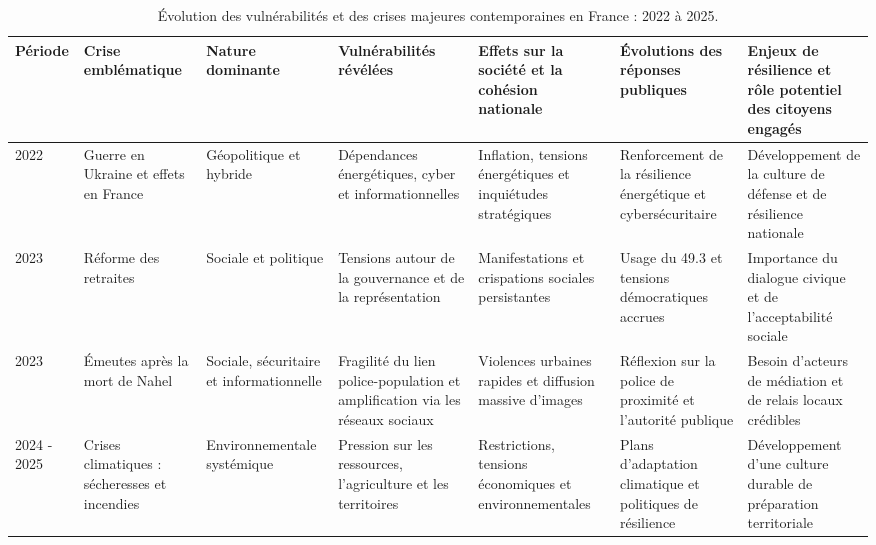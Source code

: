 \begin{table}[H]
\centering
\StyledTableSetup
\scriptsize

\begin{tabularx}{\linewidth}{@{}
p{1.2cm}
p{2.2cm}
p{2.1cm}
Y
Y
Y
Y
@{}}

\toprule
\textbf{Période} &
\textbf{Crise emblématique} &
\textbf{Nature dominante} &
\textbf{Vulnérabilités révélées} &
\textbf{Effets sur la société et la cohésion nationale} &
\textbf{Évolutions des réponses publiques} &
\textbf{Enjeux de résilience et rôle potentiel des citoyens engagés} \\
\midrule

2022 &
Guerre en Ukraine et effets en France &
Géopolitique et hybride &
Dépendances énergétiques, cyber et informationnelles &
Inflation, tensions énergétiques et inquiétudes stratégiques &
Renforcement de la résilience énergétique et cybersécuritaire &
Développement de la culture de défense et de résilience nationale\footnotemark[\noteCrisesApresDeuxMilleUkraine] \\
\addlinespace

2023 &
Réforme des retraites &
Sociale et politique &
Tensions autour de la gouvernance et de la représentation &
Manifestations et crispations sociales persistantes &
Usage du 49.3 et tensions démocratiques accrues &
Importance du dialogue civique et de l'acceptabilité sociale \\
\addlinespace

2023 &
Émeutes après la mort de Nahel &
Sociale, sécuritaire et informationnelle &
Fragilité du lien police-population et amplification via les réseaux sociaux &
Violences urbaines rapides et diffusion massive d'images &
Réflexion sur la police de proximité et l'autorité publique &
Besoin d'acteurs de médiation et de relais locaux crédibles \\
\addlinespace

2024 - 2025 &
Crises climatiques : sécheresses et incendies &
Environnementale systémique &
Pression sur les ressources, l'agriculture et les territoires &
Restrictions, tensions économiques et environnementales &
Plans d'adaptation climatique et politiques de résilience &
Développement d'une culture durable de préparation territoriale \\

\bottomrule
\end{tabularx}

\caption{Évolution des vulnérabilités et des crises majeures contemporaines en France : 2022 à 2025.}
\label{tab:crises_majeures_2022_2025_suite}
\end{table}

